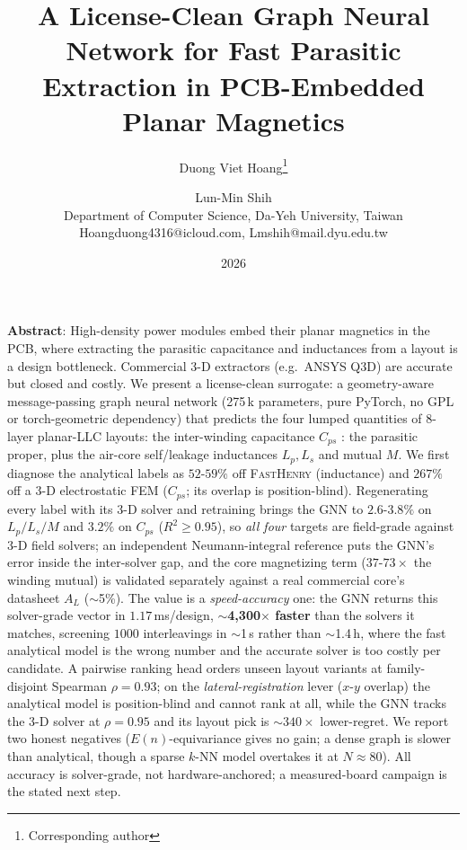\documentclass[letterpaper,twocolumn,9pt]{extarticle}
\title{A License-Clean Graph Neural Network for Fast Parasitic Extraction in
PCB-Embedded Planar Magnetics}
\author{Duong Viet Hoang\thanks{Corresponding author} \and Lun-Min Shih\\
Department of Computer Science, Da-Yeh University, Taiwan\\
Hoangduong4316@icloud.com, Lmshih@mail.dyu.edu.tw}
\date{2026}
\begin{document}

\noindent\textbf{Abstract}: High-density power modules embed their planar magnetics
in the PCB, where extracting the parasitic capacitance and inductances from a
layout is a design bottleneck. Commercial 3-D extractors (e.g.\ ANSYS Q3D) are
accurate but closed and costly. We present a license-clean surrogate: a
geometry-aware message-passing graph neural network (275\,k parameters, pure
PyTorch, no GPL or torch-geometric dependency) that predicts the four lumped
quantities of 8-layer planar-LLC layouts: the inter-winding capacitance $C_{ps}$
: the parasitic proper, plus the air-core self/leakage inductances $L_p,L_s$
and mutual $M$. We
first diagnose the analytical labels as $52$-$59\%$ off \textsc{FastHenry}
(inductance) and $267\%$ off a 3-D electrostatic FEM ($C_{ps}$; its overlap is
position-blind). Regenerating every label with its 3-D solver and retraining
brings the GNN to $2.6$-$3.8\%$ on $L_p/L_s/M$ and $3.2\%$ on $C_{ps}$
($R^2\!\ge\!0.95$), so \emph{all four} targets are field-grade
against 3-D field solvers; an independent Neumann-integral reference puts the
GNN's error inside the inter-solver gap, and the core magnetizing term
($37$-$73\times$ the winding mutual) is validated separately against a real
commercial core's datasheet $A_L$ ($\sim$5\%). The value is a
\emph{speed-accuracy} one: the GNN returns this solver-grade vector in
$1.17$\,ms/design, $\sim$\textbf{4{,}300$\times$ faster} than the solvers it
matches, screening $1000$ interleavings in $\sim$1\,s rather than $\sim$1.4\,h,
where the fast analytical model is the wrong number and the accurate solver is
too costly per candidate. A pairwise ranking head orders unseen layout variants
at family-disjoint Spearman $\rho=0.93$; on the \emph{lateral-registration} lever
($x$-$y$ overlap) the analytical model is position-blind and cannot rank at all,
while the GNN tracks the 3-D solver at $\rho=0.95$ and its layout pick is
$\sim$$340\times$ lower-regret. We report two honest negatives ($E(n)$-equivariance
gives no gain; a dense graph is slower than analytical, though a sparse $k$-NN
model overtakes it at $N\!\approx\!80$). All accuracy is solver-grade, not
hardware-anchored; a measured-board campaign is the stated next step.
\end{document}
